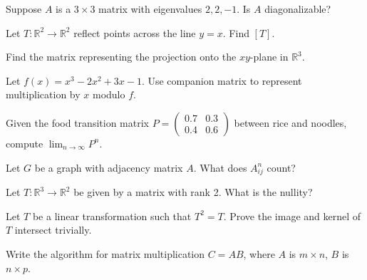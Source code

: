 \documentclass[11pt]{article}
\begin{document}
\begin{problem}
Suppose $A$ is a $3 \times 3$ matrix with eigenvalues $2, 2, -1$. Is $A$ diagonalizable?
\end{problem}

\begin{problem}
Let $T:\mathbb{R}^2 \to \mathbb{R}^2$ reflect points across the line $y = x$. Find $[T]$.
\end{problem}

\begin{problem}
Find the matrix representing the projection onto the $xy$-plane in $\mathbb{R}^3$.
\end{problem}

\begin{problem}
Let $f(x) = x^3 - 2x^2 + 3x - 1$. Use companion matrix to represent multiplication by $x$ modulo $f$.
\end{problem}

\begin{problem}
Given the food transition matrix $P = \begin{pmatrix}0.7 & 0.3\\0.4 & 0.6\end{pmatrix}$ between rice and noodles, compute $\lim_{n\to\infty}P^n$.
\end{problem}

\begin{problem}
Let $G$ be a graph with adjacency matrix $A$. What does $A^n_{ij}$ count?
\end{problem}

\begin{problem}
Let $T:\mathbb{R}^3 \to \mathbb{R}^2$ be given by a matrix with rank 2. What is the nullity?
\end{problem}

\begin{problem}
Let $T$ be a linear transformation such that $T^2 = T$. Prove the image and kernel of $T$ intersect trivially.
\end{problem}

\begin{problem}
Write the algorithm for matrix multiplication $C = AB$, where $A$ is $m \times n$, $B$ is $n \times p$.
\end{problem}
\end{document}
